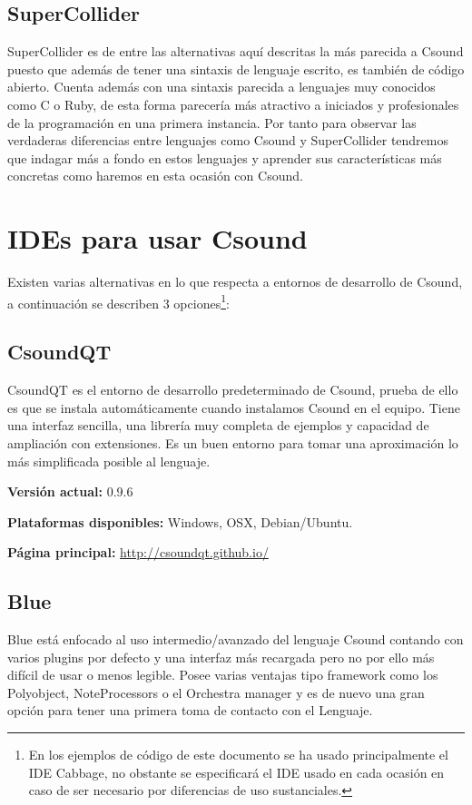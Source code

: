 \subsection{SuperCollider}
SuperCollider es de entre las alternativas aquí descritas la más parecida a Csound puesto que además de tener una sintaxis de lenguaje escrito, es también de código abierto.
Cuenta además con una sintaxis parecida a lenguajes muy conocidos como C o Ruby, de esta forma parecería más atractivo a iniciados y profesionales de la programación en una primera instancia.
Por tanto para observar las verdaderas diferencias entre lenguajes como Csound y SuperCollider tendremos que indagar más a fondo en estos lenguajes y aprender sus características más concretas como haremos en esta ocasión con Csound.

\section{IDEs para usar Csound}\label{sec:intro}
Existen varias alternativas en lo que respecta a entornos de desarrollo de Csound, a continuación se describen 3 opciones\footnote{En los ejemplos de código de este documento se ha usado principalmente el IDE Cabbage, no obstante se especificará el IDE usado en cada ocasión en caso de ser necesario por diferencias de uso sustanciales.}:

\subsection{CsoundQT}
CsoundQT es el entorno de desarrollo predeterminado de Csound, prueba de ello es que se instala automáticamente cuando instalamos Csound en el equipo. Tiene una interfaz sencilla, una librería muy completa de ejemplos y capacidad de ampliación con extensiones. Es un buen entorno para tomar una aproximación lo más simplificada posible al lenguaje.\bigskip

\textbf{Versión actual: }	0.9.6\bigskip

\textbf{Plataformas disponibles: } Windows, OSX, Debian/Ubuntu.\bigskip

\textbf{Página principal: } \url{http://csoundqt.github.io/}


\subsection{Blue}
Blue está enfocado al uso intermedio/avanzado del lenguaje Csound contando con varios plugins por defecto y una interfaz más recargada pero no por ello más difícil de usar o menos legible. Posee varias ventajas tipo framework como los Polyobject, NoteProcessors o el Orchestra manager y es de nuevo una gran opción para tener una primera toma de contacto con el Lenguaje.\bigskip

